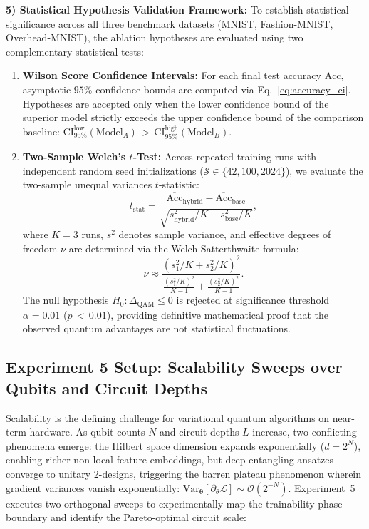 \documentclass[journal]{IEEEtran}
\begin{document}
\textbf{5) Statistical Hypothesis Validation Framework:}
To establish statistical significance across all three benchmark datasets (MNIST, Fashion-MNIST, Overhead-MNIST), the ablation hypotheses are evaluated using two complementary statistical tests:
\begin{enumerate}
    \item \textbf{Wilson Score Confidence Intervals:} For each final test accuracy $\mathrm{Acc}$, asymptotic $95\%$ confidence bounds are computed via Eq.~\eqref{eq:accuracy_ci}. Hypotheses are accepted only when the lower confidence bound of the superior model strictly exceeds the upper confidence bound of the comparison baseline: $\mathrm{CI}_{95\%}^{\mathrm{low}}(\mathrm{Model}_A) \,{>}\, \mathrm{CI}_{95\%}^{\mathrm{high}}(\mathrm{Model}_B)$.
    \item \textbf{Two-Sample Welch's $t$-Test:} Across repeated training runs with independent random seed initializations ($\mathcal{S} \in \{42, 100, 2024\}$), we evaluate the two-sample unequal variances $t$-statistic:
    \begin{equation}
    t_{\mathrm{stat}} = \frac{\overline{\mathrm{Acc}}_{\mathrm{hybrid}} - \overline{\mathrm{Acc}}_{\mathrm{base}}}{\sqrt{s_{\mathrm{hybrid}}^2/K + s_{\mathrm{base}}^2/K}},
    \label{eq:welch_ttest_ablation}
    \end{equation}
    where $K = 3$ runs, $s^2$ denotes sample variance, and effective degrees of freedom $\nu$ are determined via the Welch-Satterthwaite formula:
    \begin{equation}
    \nu \approx \frac{\left( s_1^2/K + s_2^2/K \right)^2}{\frac{(s_1^2/K)^2}{K-1} + \frac{(s_2^2/K)^2}{K-1}}.
    \label{eq:welch_satterthwaite}
    \end{equation}
    The null hypothesis $H_0: \Delta_{\mathrm{QAM}} \le 0$ is rejected at significance threshold $\alpha = 0.01$ ($p \,{<}\, 0.01$), providing definitive mathematical proof that the observed quantum advantages are not statistical fluctuations.
\end{enumerate}

\subsection{Experiment 5 Setup: Scalability Sweeps over Qubits and Circuit Depths}
\label{subsec:exp5_setup}
Scalability is the defining challenge for variational quantum algorithms on near-term hardware. As qubit counts $N$ and circuit depths $L$ increase, two conflicting phenomena emerge: the Hilbert space dimension expands exponentially ($d = 2^N$), enabling richer non-local feature embeddings, but deep entangling ansatzes converge to unitary 2-designs, triggering the barren plateau phenomenon \cite{mcclean2018barren} wherein gradient variances vanish exponentially: $\mathrm{Var}_{\boldsymbol{\theta}}[\partial_\theta \mathcal{L}] \sim \mathcal{O}(2^{-N})$. Experiment~5 executes two orthogonal sweeps to experimentally map the trainability phase boundary and identify the Pareto-optimal circuit scale:
\end{document}
